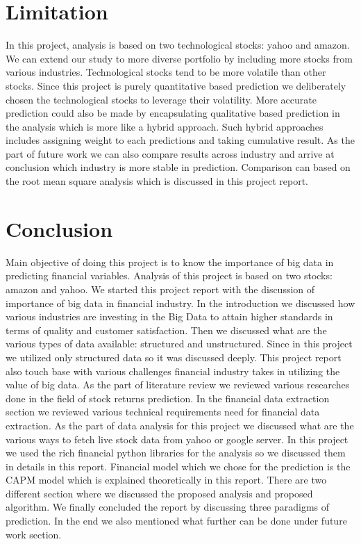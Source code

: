 \section{Limitation}
In this project, analysis is based on two technological stocks: yahoo and amazon. We can extend our study to more diverse portfolio by including more stocks 
from various industries. Technological stocks tend to be more volatile than other stocks. Since this project is purely quantitative based prediction we 
deliberately chosen the technological stocks to leverage their volatility. More accurate prediction could also be made by encapsulating qualitative based prediction
 in the analysis which is more like a hybrid approach. Such hybrid approaches includes assigning weight to each predictions and taking cumulative result.  
 As the part of future work we can also compare results across industry and arrive at conclusion which industry is more stable in prediction. Comparison can based on 
the root mean square analysis which is discussed in this project report.  


\section{Conclusion}
Main objective of doing this project is to know the importance of big data in predicting financial variables. Analysis of this project is based on two stocks:
amazon and yahoo. We started this project report with the discussion of importance of big data in financial industry. In the introduction we discussed how various
industries are investing in the Big Data to attain higher standards in terms of quality and customer satisfaction. Then we discussed what are the various types 
of data available: structured and unstructured. Since in this project we utilized only structured data so it was discussed deeply. This project report also touch base
with various challenges financial industry takes in utilizing the value of big data. As the part of literature review we reviewed various researches done in the field of 
stock returns prediction. In the financial data extraction section we reviewed various technical requirements need for financial data extraction. As the part 
of data analysis for this project we discussed what are the various ways to fetch live stock data from yahoo or google server. In this project  we used the 
rich financial python libraries for the analysis so we discussed them in details in this report.  Financial model which we chose for the prediction is the CAPM model which 
is explained theoretically in this report.  There are two different section where we discussed the proposed analysis and proposed algorithm. We finally concluded the 
report by discussing three paradigms of prediction. In the end we also mentioned what further can be done under future work section. 
 

